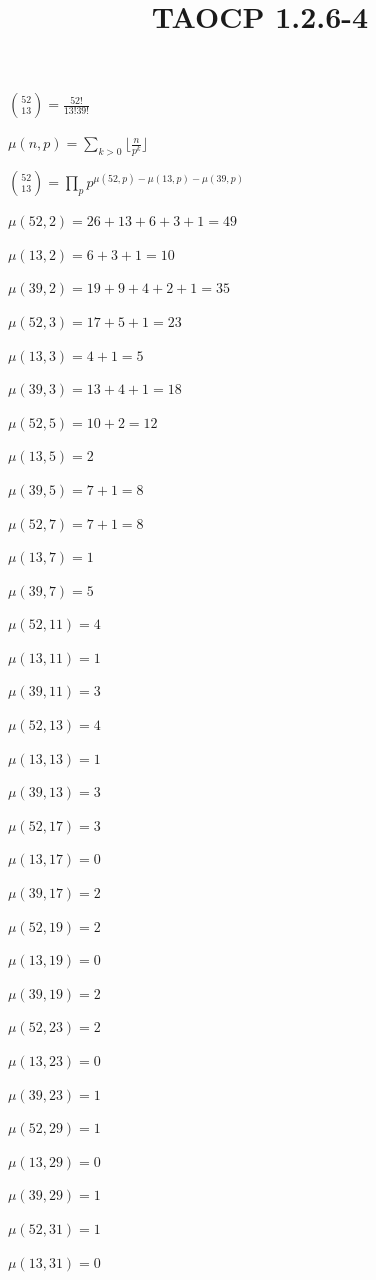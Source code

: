 \documentclass{article}
\title{TAOCP 1.2.6\mbox{-}4}
\begin{document}
\maketitle

\( \binom{52}{13} = \frac{52!}{13! 39!} \)

\( \mu(n,p) = \sum_{k > 0}{\lfloor{\frac{n}{p^{k}}}\rfloor} \)

\( \binom{52}{13} = \prod_{p} p^{\mu(52,p) - \mu(13,p) - \mu(39,p)} \)

\( \mu(52,2) = 26 + 13 + 6 + 3 + 1 = 49 \)

\( \mu(13,2) = 6 + 3 + 1 = 10 \)

\( \mu(39,2) = 19 + 9 + 4 + 2 + 1 = 35 \)

\( \mu(52,3) = 17 + 5 + 1 = 23 \)

\( \mu(13,3) = 4 + 1 = 5 \)

\( \mu(39,3) = 13 + 4 + 1 = 18 \)

\( \mu(52,5) = 10 + 2 = 12 \)

\( \mu(13,5) = 2 \)

\( \mu(39,5) = 7 + 1 = 8 \)

\( \mu(52,7) = 7 + 1 = 8 \)

\( \mu(13,7) = 1 \)

\( \mu(39,7) = 5 \)

\( \mu(52,11) = 4 \)

\( \mu(13,11) = 1 \)

\( \mu(39,11) = 3 \)

\( \mu(52,13) = 4 \)

\( \mu(13,13) = 1 \)

\( \mu(39,13) = 3 \)

\( \mu(52,17) = 3 \)

\( \mu(13,17) = 0 \)

\( \mu(39,17) = 2 \)

\( \mu(52,19) = 2 \)

\( \mu(13,19) = 0 \)

\( \mu(39,19) = 2 \)

\( \mu(52,23) = 2 \)

\( \mu(13,23) = 0 \)

\( \mu(39,23) = 1 \)

\( \mu(52,29) = 1 \)

\( \mu(13,29) = 0 \)

\( \mu(39,29) = 1 \)

\( \mu(52,31) = 1 \)

\( \mu(13,31) = 0 \)
\end{document}
